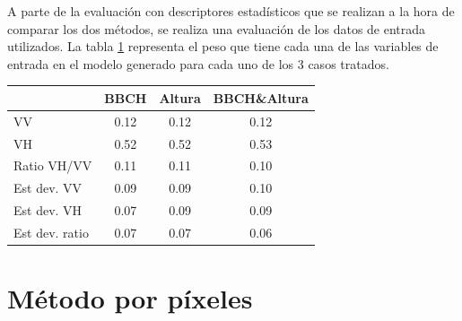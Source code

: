 \par A parte de la evaluación con descriptores estadísticos que se realizan a la hora de comparar los dos métodos, se realiza una evaluación de los datos de entrada utilizados. La tabla \ref{tab:imp_f} representa el peso que tiene cada una de las variables de entrada en el modelo generado para cada uno de los 3 casos tratados. 

\begin{table}[h] \label{tab:imp_f}
\begin{tabular}{l|ccc}
               & BBCH & Altura & BBCH\&Altura \\ \hline \hline
VV             & 0.12 & 0.12   & 0.12         \\
VH             & 0.52 & 0.52   & 0.53         \\
Ratio VH/VV    & 0.11 & 0.11   & 0.10         \\
Est dev. VV    & 0.09 & 0.09   & 0.10         \\
Est dev. VH    & 0.07 & 0.09   & 0.09         \\
Est dev. ratio & 0.07 & 0.07   & 0.06        
\end{tabular}
\end{table}

\section{Método por píxeles} 
